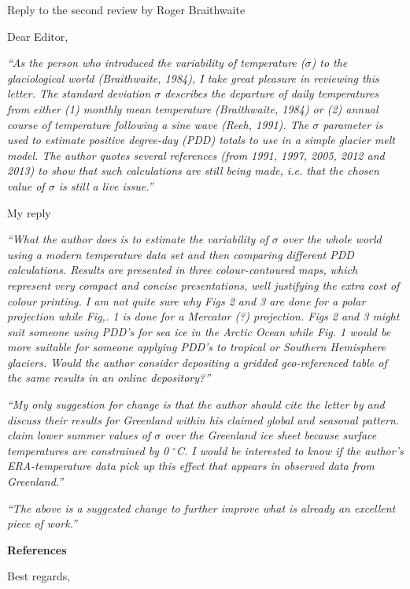 \documentclass{letter}
\newcommand{\rev}[0]{\color{blue!50!black}\it}
\newcommand{\textrev}[1]{{\rev``#1''}}
\begin{document}
\begin{letter}{Reply to the second review by Roger Braithwaite}

\opening{Dear Editor,}

\textrev{As the person who introduced the variability of temperature ($\sigma$) to the glaciological world (Braithwaite, 1984), I take great pleasure in reviewing this letter. The standard deviation $\sigma$ describes the departure of daily temperatures from either (1) monthly mean temperature (Braithwaite, 1984) or (2) annual course of temperature following a sine wave (Reeh, 1991). The $\sigma$ parameter is used to estimate positive degree-day (PDD) totals to use in a simple glacier melt model. The author quotes several references (from 1991, 1997, 2005, 2012 and 2013) to show that such calculations are still being made, i.e. that the chosen value of $\sigma$ is still a live issue.}

My reply

\textrev{What the author does is to estimate the variability of $\sigma$ over the whole world using a modern temperature data set and then comparing different PDD calculations. Results are presented in three colour-contoured maps, which represent very compact and concise presentations, well justifying the extra cost of colour printing. I am not quite sure why Figs 2 and 3 are done for a polar projection while Fig,. 1 is done for a Mercator (?) projection. Figs 2 and 3 might suit someone using PDD’s for sea ice in the Arctic Ocean while Fig. 1 would be more suitable for someone applying PDD’s to tropical or Southern Hemisphere glaciers. Would the author consider depositing a gridded geo-referenced table of the same results in an online depository?}

\textrev{My only suggestion for change is that the author should cite the letter by \citep{fausto-etal-2011} and discuss their results for Greenland within his claimed global and seasonal pattern. \citet{fausto-etal-2011} claim lower summer values of $\sigma$ over the Greenland ice sheet because surface temperatures are constrained by 0 $^\circ$C. I would be interested to know if the author’s ERA-temperature data pick up this effect that appears in observed data from Greenland.}

\textrev{The above is a suggested change to further improve what is already an excellent piece of work.}

\textbf{References}



\closing{Best regards,}

\end{letter}
\end{document}
